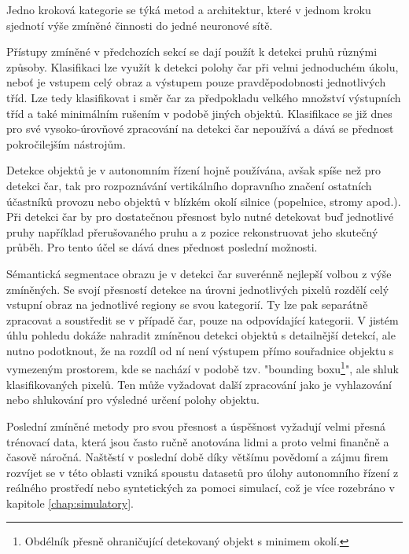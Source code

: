 \documentclass[czech, bc, kky, he, iso690numb]{fasthesis}
\begin{document}
            	Jedno kroková kategorie se týká metod a architektur, které v jednom kroku sjednotí výše zmíněné činnosti do jedné neuronové sítě.
            	
            	Přístupy zmíněné v předchozích sekcí se dají použít k detekci pruhů různými způsoby. Klasifikaci lze využít k detekci polohy čar při velmi jednoduchém úkolu, neboť je vstupem celý obraz a výstupem pouze pravděpodobnosti jednotlivých tříd. Lze tedy klasifikovat i směr čar za předpokladu velkého množství výstupních tříd a také minimálním rušením v podobě jiných objektů. Klasifikace se již dnes pro své vysoko-úrovňové zpracování na detekci čar nepoužívá a dává se přednost pokročilejším nástrojům.
            	
            	Detekce objektů je v autonomním řízení hojně používána, avšak spíše než pro detekci čar, tak pro rozpoznávání vertikálního dopravního značení ostatních účastníků provozu nebo objektů v blízkém okolí silnice (popelnice, stromy apod.). Při detekci čar by pro dostatečnou přesnost bylo nutné detekovat buď jednotlivé pruhy například přerušovaného pruhu a z pozice rekonstruovat jeho skutečný průběh. Pro tento účel se dává dnes přednost poslední možnosti.
            	
            	Sémantická segmentace obrazu je v detekci čar suverénně nejlepší volbou z výše zmíněných. Se svojí přesností detekce na úrovni jednotlivých pixelů rozdělí celý vstupní obraz na jednotlivé regiony se svou kategorií. Ty lze pak separátně zpracovat a soustředit se v případě čar, pouze na odpovídající kategorii. V jistém úhlu pohledu dokáže nahradit zmíněnou detekci objektů s detailnější detekcí, ale nutno podotknout, že na rozdíl od ní není výstupem přímo souřadnice objektu s vymezeným prostorem, kde se nachází v podobě tzv. "bounding boxu\footnote{Obdélník přesně ohraničující detekovaný objekt s minimem okolí.}", ale shluk klasifikovaných pixelů. Ten může vyžadovat další zpracování jako je vyhlazování nebo shlukování pro výsledné určení polohy objektu.
            	
            	Poslední zmíněné metody pro svou přesnost a úspěšnost vyžadují velmi přesná trénovací data, která jsou často ručně anotována lidmi a proto velmi finančně a časově náročná. Naštěstí v poslední době díky většímu povědomí a zájmu firem rozvíjet se v této oblasti vzniká spoustu datasetů pro úlohy autonomního řízení z reálného prostředí nebo syntetických za pomoci simulací, což je více rozebráno v kapitole \ref{chap:simulatory}.
            
\end{document}
